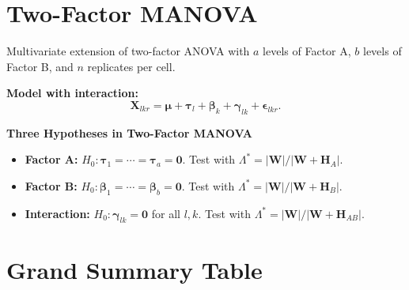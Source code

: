 \documentclass[12pt, a4paper]{article}
\newcommand{\muv}{\boldsymbol{\mu}}
\newcommand{\tauv}{\boldsymbol{\tau}}
\newcommand{\betav}{\boldsymbol{\beta}}
\newcommand{\epsilonv}{\boldsymbol{\epsilon}}
\begin{document}
\section{Two-Factor MANOVA}

Multivariate extension of two-factor ANOVA with $a$ levels of Factor A, $b$ levels of Factor B, and $n$ replicates per cell.

\textbf{Model with interaction:}
\[
  \mathbf{X}_{lkr} = \muv + \tauv_l + \betav_k + \boldsymbol{\gamma}_{lk} + \epsilonv_{lkr}.
\]

\begin{keybox}\noindent\textbf{Three Hypotheses in Two-Factor MANOVA}\par\smallskip
\begin{itemize}
  \item \textbf{Factor A:} $H_0: \tauv_1 = \cdots = \tauv_a = \mathbf{0}$. Test with $\Lambda^* = |\mathbf{W}|/|\mathbf{W}+\mathbf{H}_A|$.
  \item \textbf{Factor B:} $H_0: \betav_1 = \cdots = \betav_b = \mathbf{0}$. Test with $\Lambda^* = |\mathbf{W}|/|\mathbf{W}+\mathbf{H}_B|$.
  \item \textbf{Interaction:} $H_0: \boldsymbol{\gamma}_{lk} = \mathbf{0}$ for all $l,k$. Test with $\Lambda^* = |\mathbf{W}|/|\mathbf{W}+\mathbf{H}_{AB}|$.
\end{itemize}
\end{keybox}

\section{Grand Summary Table}
\end{document}

